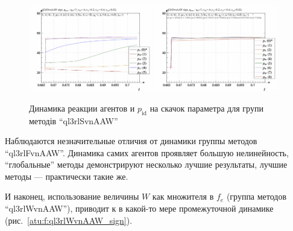 \begin{figure}[htb!]
  \begin{center}
    \includegraphics[width=0.48\textwidth]{p/sign/qls-p_t_pi_m_ql3rlSvnAAW_sign.png}
    \hfill
    \includegraphics[width=0.48\textwidth]{p/sign/qls-p_t_p_m_ql3rlSvnAAW_sign.png}
  \end{center}
  \caption{Динамика реакции агентов и $p_\mathrm{id}$ на скачок параметра для групи методів ``ql3rlSvnAAW''}
  \label{atu:f:ql3rlSvnAAW_sign}
\end{figure}

Наблюдаются незначительные отличия от динамики группы методов ``ql3rlFvnAAW''.
Динамика самих агентов проявляет большую нелинейность,
``глобальные'' методы демонстрируют несколько лучшие результаты,
лучшие методы --- практически такие же.

И наконец, использование величины $W$ как множителя в $f_e$
(группа методов ``ql3rlWvnAAW''), приводит к в какой-то мере
промежуточной динамике
(рис.~\ref{atu:f:ql3rlWvnAAW_sign}).

